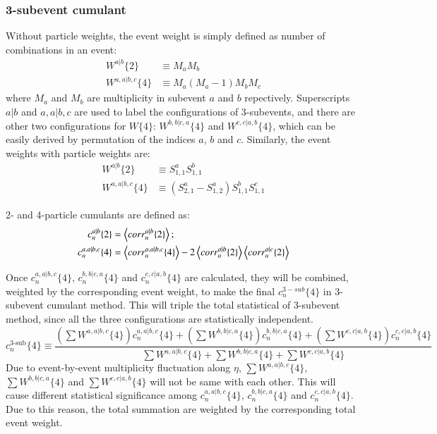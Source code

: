 \subsubsection{3-subevent cumulant}
Without particle weights, the event weight is simply defined as number of combinations in an event:
\begin{equation}
\begin{split}
W^{a|b}\{2\}&\equiv M_{a}M_{b} \\
W^{a,a|b,c}\{4\}&\equiv M_{a}(M_{a}-1)M_{b}M_{c}
\end{split}
\end{equation}
where $M_{a}$ and $M_{b}$ are multiplicity in subevent $a$ and $b$ repectively. Superscripts $a|b$ and $a,a|b,c$ are used to label the configurations of 3-subevents, and there are other two configurations for $W\{4\}$: $W^{b,b|c,a}\{4\}$ and $W^{c,c|a,b}\{4\}$, which can be easily derived by permutation of the indices $a$, $b$ and $c$.
Similarly, the event weights with particle weights are:
\begin{equation}
\begin{split}
W^{a|b}\{2\}&\equiv S_{1,1}^a S_{1,1}^b \\
W^{a,a|b,c}\{4\}&\equiv (S_{2,1}^a-S_{1,2}^a)S_{1,1}^b S_{1,1}^c
\end{split}
\end{equation}

2- and 4-particle cumulants are defined as:
\begin{equation}
\begin{split}
c_n^{a|b}\{2\}&= \left\langle corr_n^{a|b}\{2\}\right\rangle; \\
c_n^{a,a|b,c}\{4\}&= \left\langle corr_n^{a,a|b,c}\{4\}\right\rangle-2\left\langle corr_n^{a|b}\{2\}\right\rangle\left\langle corr_n^{a|c}\{2\}\right\rangle
\end{split}
\end{equation}

Once $c_n^{a,a|b,c}\{4\}$, $c_n^{b,b|c,a}\{4\}$ and $c_n^{c,c|a,b}\{4\}$ are calculated, they will be combined, weighted by the corresponding event weight, to make the final $c_n^{3-sub}\{4\}$ in 3-subevent cumulant method. This will triple the total statistical of 3-subevent method, since all the three configurations are statistically independent.
\begin{equation}
c_n^{\text{3-sub}}\{4\} \equiv \frac{(\sum W^{a,a|b,c}\{4\}) c_n^{a,a|b,c}\{4\} + (\sum W^{b,b|c,a}\{4\}) c_n^{b,b|c,a}\{4\} + (\sum W^{c,c|a,b}\{4\}) c_n^{c,c|a,b}\{4\}}{\sum W^{a,a|b,c}\{4\} + \sum W^{b,b|c,a}\{4\} + \sum W^{c,c|a,b}\{4\}}
\end{equation}
Due to event-by-event multiplicity fluctuation along $\eta$, $\sum W^{a,a|b,c}\{4\}$, $\sum W^{b,b|c,a}\{4\}$ and $\sum W^{c,c|a,b}\{4\}$ will not be same with each other. This will cause different statistical significance among $c_n^{a,a|b,c}\{4\}$, $c_n^{b,b|c,a}\{4\}$ and $c_n^{c,c|a,b}\{4\}$. Due to this reason, the total summation are weighted by the corresponding total event weight.



